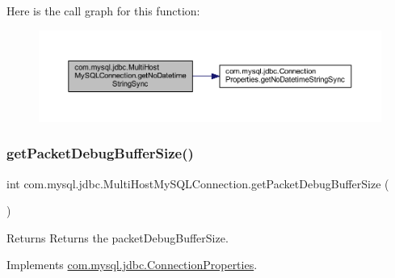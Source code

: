 Here is the call graph for this function\+:
\nopagebreak
\begin{figure}[H]
\begin{center}
\leavevmode
\includegraphics[width=350pt]{classcom_1_1mysql_1_1jdbc_1_1_multi_host_my_s_q_l_connection_a6b3c51428efc616f8a08b2e5c70b75cd_cgraph}
\end{center}
\end{figure}
\mbox{\label{classcom_1_1mysql_1_1jdbc_1_1_multi_host_my_s_q_l_connection_a7201e5e89691f622bba29279e5e49ffb}} 
\subsubsection{\texorpdfstring{get\+Packet\+Debug\+Buffer\+Size()}{getPacketDebugBufferSize()}}
{\footnotesize\ttfamily int com.\+mysql.\+jdbc.\+Multi\+Host\+My\+S\+Q\+L\+Connection.\+get\+Packet\+Debug\+Buffer\+Size (\begin{DoxyParamCaption}{ }\end{DoxyParamCaption})}

\begin{DoxyReturn}{Returns}
Returns the packet\+Debug\+Buffer\+Size. 
\end{DoxyReturn}


Implements \mbox{\hyperlink{interfacecom_1_1mysql_1_1jdbc_1_1_connection_properties_ad21609c6c63ee0b69b4abdd5c4c7f39c}{com.\+mysql.\+jdbc.\+Connection\+Properties}}.

